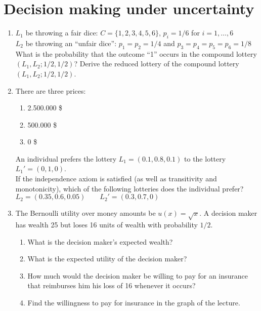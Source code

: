\documentclass[a4paper,12pt]{article}
\begin{document}
\section{Decision making under uncertainty}
\label{sec:decis-making-under}

\begin{enumerate}
  \item $L_1$ be throwing a fair dice: $C=\{1,2,3,4,5,6\}$, $p_i=1/6$ for $i=1,\dots,6$\\
$L_2$ be throwing an ``unfair dice'': $p_1=p_2=1/4$ and $p_3=p_4=p_5=p_6=1/8$\\
What is the probability that the outcome ``1'' occurs in the compound lottery $(L_1,L_2;1/2,1/2)$? Derive the reduced lottery of the compound lottery $(L_1,L_2;1/2,1/2)$.
 \item  There are three prices:
  \begin{enumerate}
  \item 2.500.000 \$
  \item 500.000 \$
  \item 0 \$
  \end{enumerate}
An individual prefers the lottery $L_1=(0.1,0.8,0.1)$ to the lottery $L_1'=(0,1,0)$.\\
If the independence axiom is satisfied (as well as transitivity and monotonicity), which of the following lotteries does the individual prefer?\\
$L_2=(0.35,0.6,0.05)\qquad L_2'=(0.3,0.7,0)$
\item The Bernoulli utility over money amounts be $u(x)=\sqrt{x}$. A decision maker has wealth 25 but loses 16 units of wealth with probability $1/2$.
  \begin{enumerate}
  \item What is the decision maker's expected wealth?
  \item What is the expected utility of the decision maker?
  \item How much would the decision maker be willing to pay for an insurance that reimburses him his loss of 16 whenever it occurs?
  \item Find the willingness to pay for insurance in the graph of the lecture. 

\end{enumerate}
\end{enumerate}
\end{document}
